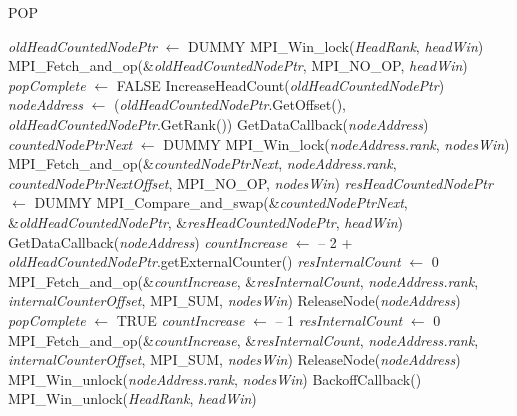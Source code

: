 \documentclass{article}
\begin{document}
	\begin{algorithm}
		\caption{POP}
		\begin{algorithmic}[1]
			\STATE \textit{oldHeadCountedNodePtr} $\leftarrow$ DUMMY 
			\STATE MPI\_Win\_lock(\textit{HeadRank}, \textit{headWin}) 
			\STATE MPI\_Fetch\_and\_op(\&\textit{oldHeadCountedNodePtr}, 
			MPI\_NO\_OP,
			\textit{headWin}) 
			\STATE \textit{popComplete} $\leftarrow$ FALSE 
			\STATE  IncreaseHeadCount(\textit{oldHeadCountedNodePtr}) 
			\STATE \textit{nodeAddress} $\leftarrow$ (\textit{oldHeadCountedNodePtr}.GetOffset(), \textit{oldHeadCountedNodePtr}.GetRank()) 
			\STATE  GetDataCallback(\textit{nodeAddress}) 
			\RETURN
			\ENDIF 
			\STATE \textit{countedNodePtrNext} $\leftarrow$ DUMMY 
			\STATE MPI\_Win\_lock(\textit{nodeAddress.rank}, \textit{nodesWin}) 
			\STATE MPI\_Fetch\_and\_op(\&\textit{countedNodePtrNext}, \textit{nodeAddress.rank}, \textit{countedNodePtrNextOffset}, MPI\_NO\_OP, \textit{nodesWin}) 
			\STATE \textit{resHeadCountedNodePtr} $\leftarrow$ DUMMY 
			\STATE MPI\_Compare\_and\_swap(\&\textit{countedNodePtrNext}, \&\textit{oldHeadCountedNodePtr}, \&\textit{resHeadCountedNodePtr}, \textit{headWin}) 
			\STATE GetDataCallback(\textit{nodeAddress})
			\STATE \textit{countIncrease} $\leftarrow$ -- 2 + \textit{oldHeadCountedNodePtr}.getExternalCounter() 
			\STATE \textit{resInternalCount} $\leftarrow$ 0 
			\STATE MPI\_Fetch\_and\_op(\&\textit{countIncrease}, 
			\&\textit{resInternalCount}, 
			\textit{nodeAddress.rank}, 
			\textit{internalCounterOffset}, 
			MPI\_SUM, 
			\textit{nodesWin})
			\STATE ReleaseNode(\textit{nodeAddress}) 
			\ENDIF 
			\STATE \textit{popComplete} $\leftarrow$ TRUE 
			\ELSE 
			\STATE \textit{countIncrease} $\leftarrow$ -- 1 
			\STATE \textit{resInternalCount} $\leftarrow$ 0 
			\STATE MPI\_Fetch\_and\_op(\&\textit{countIncrease}, 
			\&\textit{resInternalCount},
			\textit{nodeAddress.rank},
			\textit{internalCounterOffset},
			MPI\_SUM,
			\textit{nodesWin})
			\STATE ReleaseNode(\textit{nodeAddress}) 
			\ENDIF 
			\ENDIF 
			\STATE MPI\_Win\_unlock(\textit{nodeAddress.rank}, \textit{nodesWin}) 
			\STATE BackoffCallback() 
			\ENDIF 
			\ENDWHILE
			\STATE MPI\_Win\_unlock(\textit{HeadRank}, \textit{headWin})
		\end{algorithmic}
	\end{algorithm}
\end{document}
